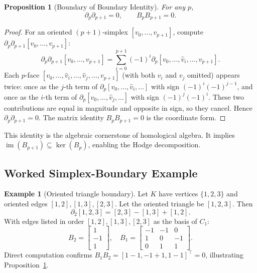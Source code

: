 \documentclass[11pt]{article}
\newtheorem{proposition}[theorem]{Proposition}
\theoremstyle{definition}
\newtheorem{example}[theorem]{Example}
\theoremstyle{remark}
\DeclareMathOperator{\im}{im}
\begin{document}
\begin{proposition}[Boundary of Boundary Identity]
\label{prop:b2}
For any $p$,
\[
  \partial_p\partial_{p+1} = 0, \qquad B_pB_{p+1} = 0.
\]
\end{proposition}

\begin{proof}
For an oriented $(p+1)$-simplex $[v_0,\dots,v_{p+1}]$, compute
$\partial_p\partial_{p+1}[v_0,\dots,v_{p+1}]$:
\[
  \partial_p\partial_{p+1}[v_0,\dots,v_{p+1}]
  = \sum_{i=0}^{p+1}(-1)^i\partial_p[v_0,\dots,\hat{v}_i,\dots,v_{p+1}].
\]
Each $p$-face $[v_0,\dots,\hat{v}_i,\dots,\hat{v}_j,\dots,v_{p+1}]$ (with both
$v_i$ and $v_j$ omitted) appears twice: once as the $j$-th term of
$\partial_p[v_0,\dots,\hat{v}_i,\dots]$ with sign $(-1)^i(-1)^{j-1}$, and
once as the $i$-th term of $\partial_p[v_0,\dots,\hat{v}_j,\dots]$ with sign
$(-1)^j(-1)^i$. These two contributions are equal in magnitude and opposite in
sign, so they cancel. Hence $\partial_p\partial_{p+1}=0$. The matrix identity
$B_pB_{p+1}=0$ is the coordinate form.
\end{proof}

This identity is the algebraic cornerstone of homological algebra. It implies
$\im(B_{p+1})\subseteq\ker(B_p)$, enabling the Hodge decomposition.

\subsection{Worked Simplex-Boundary Example}

\begin{example}[Oriented triangle boundary]
\label{ex:boundary}
Let $K$ have vertices $\{1,2,3\}$ and oriented edges
$[1,2],[1,3],[2,3]$. Let the oriented triangle be $[1,2,3]$. Then
\[
  \partial_2[1,2,3] = [2,3] - [1,3] + [1,2].
\]
With edges listed in order $[1,2],[1,3],[2,3]$ as the basis of $C_1$:
\[
  B_2 = \begin{bmatrix} 1 \\ -1 \\ 1 \end{bmatrix},\quad
  B_1 = \begin{bmatrix} -1 & -1 & 0 \\ 1 & 0 & -1 \\ 0 & 1 & 1 \end{bmatrix}.
\]
Direct computation confirms $B_1 B_2 = [1-1, -1+1, 1-1]^\top = 0$,
illustrating Proposition~\ref{prop:b2}.
\end{example}


\end{document}
